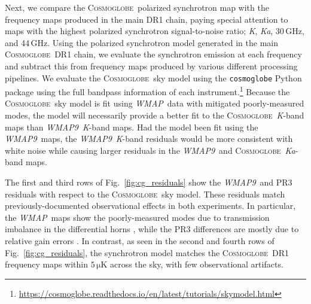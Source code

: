 \documentclass[twocolumn]{../../common/aa}
\def\WMAP{\emph{WMAP}}
\def\WMAPnine{\emph{WMAP9}}
\def\Planck{\emph{Planck}}
\newcommand{\cosmoglobe}{\textsc{Cosmoglobe}}
\newcommand{\K}[0]{\textit K}
\newcommand{\Ka}[0]{\textit{Ka}}
\begin{document}
Next, we compare the \cosmoglobe\ polarized synchrotron map with the frequency maps produced in the main DR1 chain, paying special attention to maps with the highest polarized synchrotron signal-to-noise ratio; \K, \Ka, 30\,GHz, and 44\,GHz.
Using the polarized synchrotron model generated in the main \cosmoglobe\ DR1 chain, we evaluate the synchrotron emission at each frequency and subtract this from frequency maps produced by various different processing pipelines. We evaluate the \cosmoglobe\ sky model using the \texttt{cosmoglobe} Python package using the full bandpass information of each instrument.\footnote{\url{https://cosmoglobe.readthedocs.io/en/latest/tutorials/skymodel.html}} 
Because the \cosmoglobe\ sky model is fit using \WMAP\ data with mitigated poorly-measured modes, the model will necessarily provide a better fit to the \cosmoglobe\ \K-band maps than \WMAPnine\ \K-band maps. Had the model been fit using the \WMAPnine\ maps, the \WMAPnine\ \K-band residuals would be more consistent with white noise while causing larger residuals in the \WMAPnine\ and \cosmoglobe\ \Ka-band maps.


The first and third rows of Fig.~\ref{fig:cg_residuals} show the \WMAPnine\ and PR3 residuals with respect to the \cosmoglobe\ sky model. These residuals match previously-documented observational effects in both experiments. In particular, the \WMAP\ maps show the poorly-measured modes due to transmission imbalance in the differential horns \citep{jarosik2007,bennett2012}, while the PR3  differences are mostly  due to relative gain errors \citep{planck2016-l02,planck2020-LVII}.
In contrast, as seen in the second and fourth rows of Fig.~\ref{fig:cg_residuals}, the synchrotron model matches the \cosmoglobe\ DR1 frequency maps within $5\,\mathrm{\mu K}$ across the sky, with few observational artifacts. 
\end{document}
